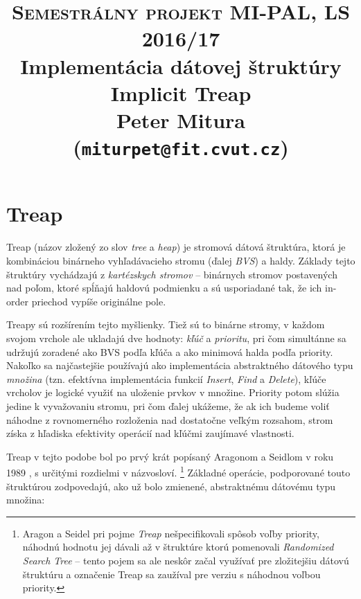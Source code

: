 \documentclass[a4paper, 12pt]{article}
\theoremstyle{definition}
\begin{document}
\title{\textsc{\large{Semestrálny projekt MI-PAL, LS 2016/17}}\\
\vspace{1cm}
\large{Implementácia dátovej štruktúry}\\
\Huge{Implicit Treap}\\
\vspace{1cm}
\normalsize{Peter Mitura (\texttt{miturpet@fit.cvut.cz})}}
\date{}

\maketitle

\section{Treap}

Treap (názov zložený zo slov \emph{tree} a \emph{heap}) je stromová dátová štruktúra,
ktorá je kombináciou binárneho vyhľadávacieho stromu (ďalej \emph{BVS}) a haldy.
Základy tejto štruktúry vychádzajú z \emph{kartézskych stromov}
\cite{cartesian} -- binárnych stromov postavených nad poľom, ktoré spĺňajú
haldovú podmienku a sú usporiadané tak, že ich in-order priechod vypíše
originálne pole.

Treapy sú rozšírením tejto myšlienky. Tiež sú to binárne stromy, v každom
svojom vrchole ale ukladajú dve hodnoty: \emph{kľúč} a \emph{prioritu}, pri čom
simultánne sa udržujú zoradené ako BVS podľa kľúča a ako minimová halda podľa
priority.  Nakoľko sa najčastejšie používajú ako implementácia abstraktného
dátového typu \emph{množina} (tzn. efektívna implementácia funkcií
\emph{Insert}, \emph{Find} a \emph{Delete}), kľúče vrcholov je logické využiť
na uloženie prvkov v množine. Priority potom slúžia jedine k vyvažovaniu
stromu, pri čom ďalej ukážeme, že ak ich budeme voliť náhodne z rovnomerného
rozloženia nad dostatočne veľkým rozsahom, strom získa z hľadiska efektivity
operácií nad kľúčmi zaujímavé vlastnosti.

Treap v tejto podobe bol po prvý krát popísaný Aragonom a Seidlom v roku 1989
\cite{treaps}, s určitými rozdielmi v názvosloví.
\footnote{Aragon a Seidel
pri pojme \emph{Treap} nešpecifikovali spôsob voľby priority, náhodnú hodnotu
jej dávali až v štruktúre ktorú pomenovali \emph{Randomized Search Tree} --
tento pojem sa ale neskôr začal využívať pre zložitejšiu dátovú štruktúru a
označenie Treap sa zaužíval pre verziu s náhodnou voľbou priority.}
Základné operácie, podporované touto štruktúrou zodpovedajú, ako už bolo
zmienené, abstraktnému dátovému typu množina:
\end{document}
